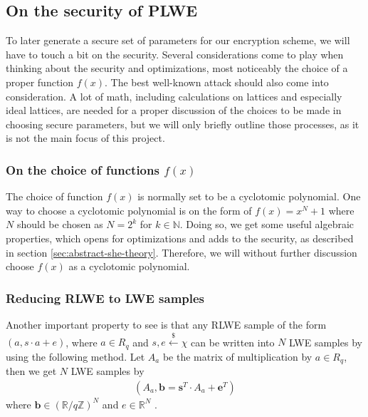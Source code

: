 \documentclass[../main.tex]{subfiles}
\newcommand{\getsrand}{\overset{\$}{\gets}}
\begin{document}
\subsection{On the security of PLWE}
    To later generate a secure set of parameters for our encryption scheme, we will have to touch a bit on the security.
    Several considerations come to play when thinking about the security and optimizations, most noticeably the choice
    of a proper function $f(x)$. The best well-known attack should also come into consideration.
    A lot of math, including calculations on lattices and especially ideal lattices, are needed for a proper discussion of the
    choices to be made in choosing secure parameters, but we will only briefly outline those processes, as it is not the main focus of this project.

    \subsubsection{On the choice of functions $f(x)$}
        The choice of function $f(x)$ is normally set to be a cyclotomic polynomial. One way to choose a cyclotomic polynomial is on the form of $f(x) = x^N + 1$ where $N$ should be chosen as $N = 2^k$ for $k \in \mathbb{N}$.
        Doing so, we get some useful algebraic properties, which opens for optimizations and adds to the security, as described in section \ref{sec:abstract-she-theory}.
        Therefore, we will without further discussion choose $f(x)$ as a cyclotomic polynomial.

    \subsubsection{Reducing RLWE to LWE samples}
        Another important property to see is that any RLWE sample of the form $(a, s \cdot a + e)$,
		where $a \in R_q$ and $s, e \getsrand{} \chi$ can be written into $N$ LWE samples by using the following method.
        Let $A_a$ be the matrix of multiplication by $a \in R_q$, then we get $N$ LWE samples by
        \begin{align*}
            (A_a, \textbf{b} = \textbf{s}^T \cdot A_a + \textbf{e}^T)
        \end{align*}
        where $\textbf{b} \in (\mathbb{R} / q\mathbb{Z})^N$ and $e \in \mathbb{R}^N$ \cite{peikert2016not}.
\end{document}
